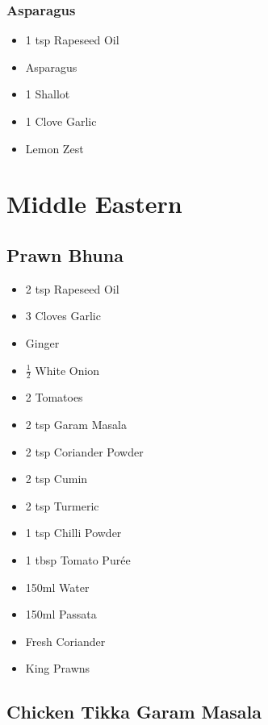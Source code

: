 \documentclass[11pt, english]{article}
\begin{document}
		\subsubsection*{Asparagus}

	\begin{itemize}
        \setlength\itemsep{0cm}
                \item 1 tsp Rapeseed Oil
		\item Asparagus
		\item 1 Shallot
		\item 1 Clove Garlic
		\item Lemon Zest
        \end{itemize}

\newpage

\section{Middle Eastern}

	\subsection{Prawn Bhuna}

	\begin{itemize}
        \setlength\itemsep{0cm}
                \item 2 tsp Rapeseed Oil
		\item 3 Cloves Garlic
		\item Ginger
		\item $\frac{1}{2}$ White Onion
		\item 2 Tomatoes
		\item 2 tsp Garam Masala
		\item 2 tsp Coriander Powder
		\item 2 tsp Cumin
		\item 2 tsp Turmeric
		\item 1 tsp Chilli Powder
		\item 1 tbsp Tomato Pur\'{e}e
		\item 150ml Water
		\item 150ml Passata
		\item Fresh Coriander
		\item King Prawns
        \end{itemize}

\newpage

	\subsection{Chicken Tikka Garam Masala}
\end{document}
